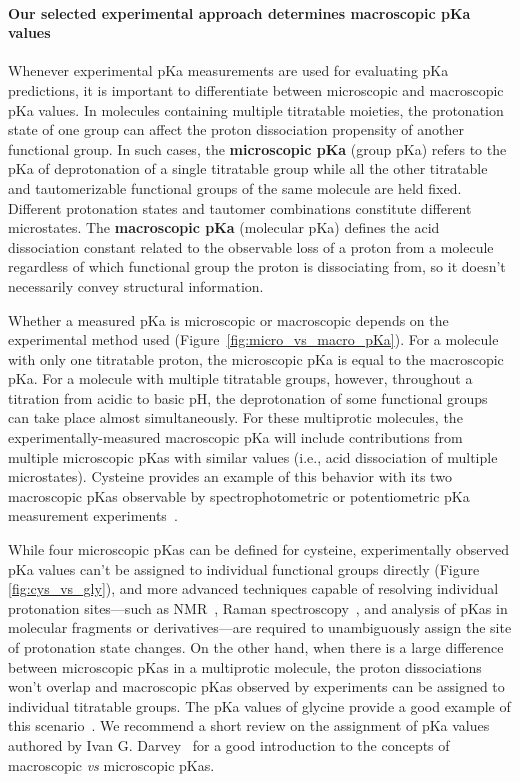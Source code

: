 \documentclass[9pt,lineno]{elife}
\begin{document}
\paragraph{Our selected experimental approach determines macroscopic pKa values}

Whenever experimental pKa measurements are used for evaluating pKa predictions, it is important to differentiate between microscopic and macroscopic pKa values. 
In molecules containing multiple titratable moieties, the protonation state of one group can affect the proton dissociation propensity of another functional group.
In such cases, the \textbf{microscopic pKa} (group pKa) refers to the pKa of deprotonation of a single titratable group while all the other titratable and tautomerizable functional groups of the same molecule are held fixed. 
Different protonation states and tautomer combinations constitute different microstates. 
The \textbf{macroscopic pKa} (molecular pKa) defines the acid dissociation constant related to the observable loss of a proton from a molecule regardless of which functional group the proton is dissociating from, so it doesn't necessarily convey structural information. 

Whether a measured pKa is microscopic or macroscopic depends on the experimental method used (Figure~\ref{fig:micro_vs_macro_pKa}). 
For a molecule with only one titratable proton, the microscopic pKa is equal to the macroscopic pKa. 
For a molecule with multiple titratable groups, however, throughout a titration from acidic to basic pH, the deprotonation of some functional groups can take place almost simultaneously. 
For these multiprotic molecules, the experimentally-measured macroscopic pKa will include contributions from multiple microscopic pKas with similar values (i.e., acid dissociation of multiple microstates). 
Cysteine provides an example of this behavior with its two macroscopic pKas observable by spectrophotometric or potentiometric pKa measurement experiments~\citep{bodner_assigning_1986,darvey_assignment_1995}. 

While four microscopic pKas can be defined for cysteine, experimentally observed pKa values can't be assigned to individual functional groups directly (Figure \ref{fig:cys_vs_gly}), and more advanced techniques capable of resolving individual protonation sites---such as NMR~\citep{bezencon_pka_2014}, Raman spectroscopy~\citep{elson_raman_1962, elbagerma_raman_2011}, and analysis of pKas in molecular fragments or derivatives---are required to unambiguously assign the site of protonation state changes. 
On the other hand, when there is a large difference between microscopic pKas in a multiprotic molecule, the proton dissociations won't overlap and macroscopic pKas observed by experiments can be assigned to individual titratable groups. 
The pKa values of glycine provide a good example of this scenario~\citep{bodner_assigning_1986,elson_raman_1962,darvey_assignment_1995}. 
We recommend a short review on the assignment of pKa values authored by Ivan G. Darvey~\citep{darvey_assignment_1995} for a good introduction to the concepts of macroscopic \emph{vs} microscopic pKas.
\end{document}
